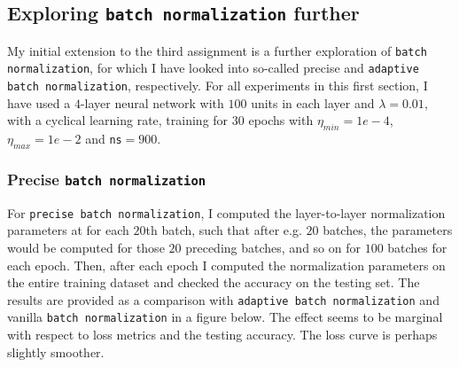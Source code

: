 \documentclass{article}
\begin{document}
\newpage

\subsection*{Exploring \texttt{batch normalization} further}
	My initial extension to the third assignment is a further exploration of \texttt{batch normalization}, for which I have looked into so-called precise and \texttt{adaptive batch normalization}, respectively. For all experiments in this first section, I have used a $4$-layer neural network with $100$ units in each layer and $\lambda = 0.01$, with a cyclical learning rate, training for $30$ epochs with $\eta_{min} = 1e-4$, $\eta_{max} = 1e-2$ and \texttt{ns}$=900$.

\subsubsection*{Precise \texttt{batch normalization}}
	For \texttt{precise batch normalization}, I computed the layer-to-layer normalization parameters at for each $20$th batch, such that after e.g. $20$ batches, the parameters would be computed for those $20$ preceding batches, and so on for $100$ batches for each epoch. Then, after each epoch I computed the normalization parameters on the entire training dataset and checked the accuracy on the testing set. The results are provided as a comparison with \texttt{adaptive batch normalization} and vanilla \texttt{batch normalization} in a figure below. The effect seems to be marginal with respect to loss metrics and the testing accuracy. The loss curve is perhaps slightly smoother.
\end{document}
